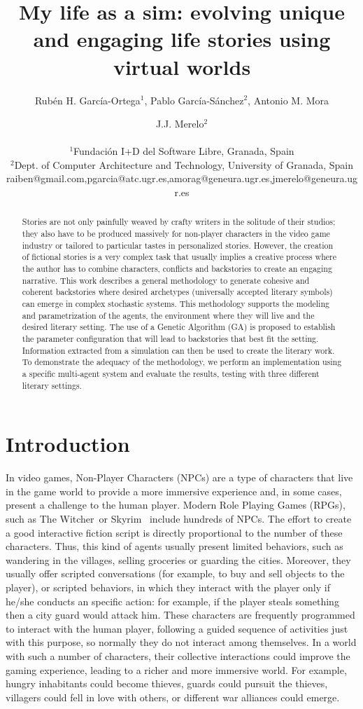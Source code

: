 \documentclass[letterpaper]{article}
\title{My life as a sim: evolving unique and engaging life stories using virtual worlds}
\author{Rub\'en H. Garc\'ia-Ortega$^{1}$, Pablo Garc\'ia-S\'anchez$^{2}$, Antonio M. Mora \and J.J. Merelo$^2$ \\
\mbox{}\\
$^1$Fundaci\'on I+D del Software Libre, Granada, Spain \\
$^2$Dept. of Computer Architecture and Technology, University of Granada, Spain \\
raiben@gmail.com,pgarcia@atc.ugr.es,amorag@geneura.ugr.es,jmerelo@geneura.ugr.es}
\begin{document}
\maketitle

\begin{abstract}
Stories are not only painfully weaved by crafty writers in the
solitude of their studios; they also have to be produced massively for
non-player characters in the video game industry or tailored to
particular tastes in personalized stories. However, the creation of
fictional stories is a very complex task that usually implies a
creative process where the author has to combine characters, 
conflicts and backstories to create an engaging narrative.
This work describes a general methodology to generate cohesive and coherent
backstories where desired archetypes (universally accepted literary symbols) can emerge in complex stochastic systems.
This methodology supports the modeling and parametrization of the agents, the environment where they will live and the desired literary setting. The use of a Genetic Algorithm (GA) is proposed to establish the parameter configuration that will lead to backstories that best fit the setting. Information extracted from a simulation can then be used to create the literary work.
To demonstrate the adequacy of the methodology, we perform an implementation using a specific multi-agent system and evaluate the results, testing with three different literary settings.
\end{abstract}


\section{Introduction}

In video games, Non-Player Characters (NPCs)  are a type of characters
that live in the game world to provide a more immersive
experience and, in some cases, present a challenge to the human player. Modern  Role Playing Games (RPGs), such as The
Witcher\texttrademark~or Skyrim\texttrademark~ include hundreds of NPCs. The effort to create a good interactive fiction script is directly proportional to the number of these characters. Thus, this kind of agents usually present limited behaviors, such as wandering in the villages, selling groceries or guarding the cities. Moreover, they usually offer scripted conversations (for example, to buy and sell objects to the player), or scripted behaviors, in which they interact with the player only if he/she conducts an specific action: for example, if the player steals something then a city guard would attack him. These characters are frequently programmed to interact with the human player, following a guided sequence of activities just with this purpose, so normally they do not interact among themselves. In a world with such a number of characters, their collective interactions could improve the gaming experience, leading to a richer and more immersive world. For example, hungry inhabitants could become thieves, guards could pursuit the thieves, villagers could fell in love with others, or different war alliances could emerge.
\end{document}
